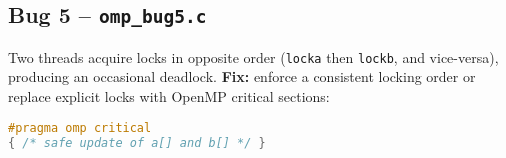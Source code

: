 \subsection*{Bug 5 – \texttt{omp\_bug5.c}}
Two threads acquire locks in opposite order (\texttt{locka} then \texttt{lockb},
and vice-versa), producing an occasional deadlock.  
\textbf{Fix:} enforce a consistent locking order or replace explicit locks with
OpenMP critical sections:
\begin{lstlisting}[language=C]
#pragma omp critical
{ /* safe update of a[] and b[] */ }
\end{lstlisting}